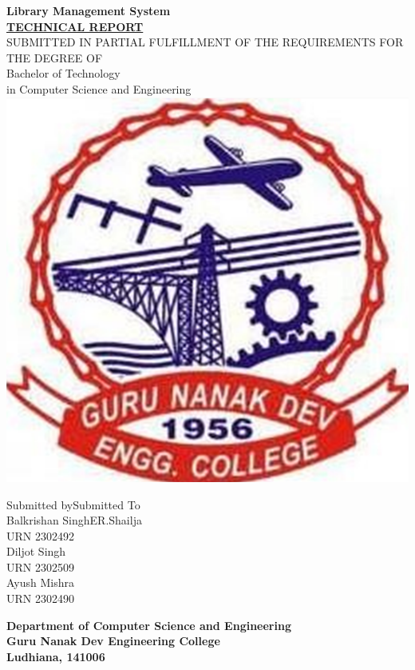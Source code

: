 \documentclass[12pt,a4paper]{report}
\begin{document}

\begin{titlepage}

    \begin{center}
        \huge{\textbf {Library Management System}}\\
        \vspace{10 mm}
        \Large{\textbf {\underline {TECHNICAL REPORT}}}\\
        \vspace{10mm}
        \large{SUBMITTED IN PARTIAL FULFILLMENT OF THE REQUIREMENTS FOR THE DEGREE OF}\\
        \normalsize{Bachelor of Technology}\\
        \normalsize{in Computer Science and Engineering}\\
        \vspace{26 mm}
        \includegraphics[height=6 cm]{"./src/GNDECLogo.png"}
    \end{center}

    \date{\today}
    \vspace{20 mm}

    \noindent
    Submitted by\hfill Submitted To\\
    Balkrishan Singh\hfill ER.Shailja\\
    URN 2302492\hfill\\
    Diljot Singh\hfill\\
    URN 2302509\hfill\\
    Ayush Mishra\hfill\\
    URN 2302490\hfill\\
    \vspace{10mm}

    \begin{center}
        \textbf{Department of Computer Science and Engineering}\\
        \textbf{Guru Nanak Dev Engineering College}\\
        \textbf{Ludhiana, 141006}\\
    \end{center}
\end{titlepage}
\end{document}
